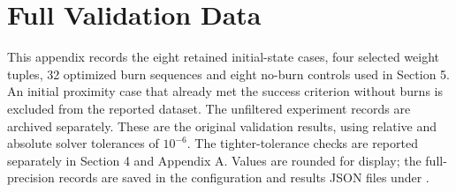 \clearpage
\section{Full Validation Data}
\label{app:validation_data}
This appendix records the eight retained initial-state cases, four selected weight tuples,
32 optimized burn sequences and eight no-burn controls used in Section 5.
An initial proximity case that already met the success criterion without burns
is excluded from the reported dataset. The unfiltered experiment records are archived separately.
These are the original validation results, using relative and absolute solver
tolerances of $10^{-6}$. The tighter-tolerance checks are reported separately
in Section 4 and Appendix A. Values are rounded for display; the full-precision
records are saved in the configuration and results JSON files under
.

